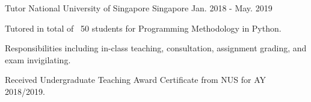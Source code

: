

\begin{cventries}

  \cventry
    {Tutor} %
    {National University of Singapore} %
    {Singapore} %
    {Jan. 2018 - May. 2019} %
    {
      \begin{cvitems} %
        \item {Tutored in total of ~50 students for Programming Methodology in Python.}
        \item {Responsibilities including in-class teaching, consultation, assignment grading, and exam invigilating.}
        \item {Received Undergraduate Teaching Award Certificate from NUS for AY 2018/2019.}
      \end{cvitems}
    }

\end{cventries}
